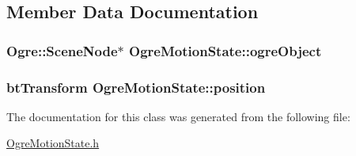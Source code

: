 \subsection{Member Data Documentation}
\hypertarget{classOgreMotionState_ae7dba01fecff53c68da9b17d63c9d504}{
\subsubsection[{ogre\-Object}]{\setlength{\rightskip}{0pt plus 5cm}Ogre\-::\-Scene\-Node$\ast$ Ogre\-Motion\-State\-::ogre\-Object\hspace{0.3cm}{\ttfamily [protected]}}}\label{classOgreMotionState_ae7dba01fecff53c68da9b17d63c9d504}
\hypertarget{classOgreMotionState_a89f91947e958b56b14bfc5ee881e9f66}{
\subsubsection[{position}]{\setlength{\rightskip}{0pt plus 5cm}bt\-Transform Ogre\-Motion\-State\-::position\hspace{0.3cm}{\ttfamily [protected]}}}\label{classOgreMotionState_a89f91947e958b56b14bfc5ee881e9f66}


The documentation for this class was generated from the following file\-:\begin{DoxyCompactItemize}
\item 
\hyperlink{OgreMotionState_8h}{Ogre\-Motion\-State.\-h}\end{DoxyCompactItemize}

